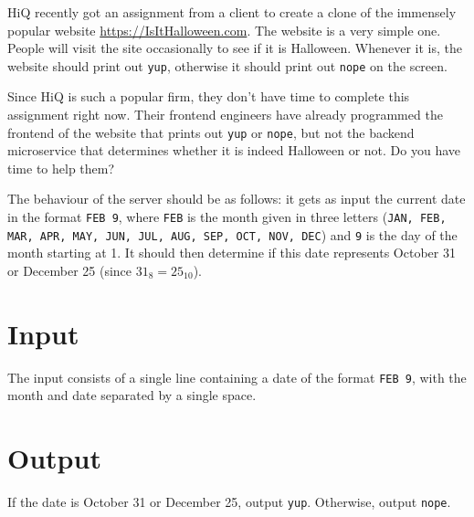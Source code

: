 
\noindent
HiQ recently got an assignment from a client to create a clone of the immensely popular website \url{https://IsItHalloween.com}.
The website is a very simple one.
People will visit the site occasionally to see if it is Halloween.
Whenever it is, the website should print out \texttt{yup}, otherwise it should print out \texttt{nope} on the screen.

Since HiQ is such a popular firm, they don't have time to complete this assignment right now.
Their frontend engineers have already programmed the frontend of the website that prints out \texttt{yup} or \texttt{nope}, but not the backend microservice that determines whether it is indeed Halloween or not.
Do you have time to help them?

The behaviour of the server should be as follows: it gets as input the current date in the format \texttt{FEB 9}, where \texttt{FEB} is the month given in three letters (\texttt{JAN, FEB, MAR, APR, MAY, JUN, JUL, AUG, SEP, OCT, NOV, DEC}) and \texttt{9} is the day of the month starting at 1.
It should then determine if this date represents October 31 or December 25 (since $31_8 = 25_{10}$).

\section*{Input}
The input consists of a single line containing a date of the format \texttt{FEB 9}, with the month and date separated by a single space.

\section*{Output}
If the date is October 31 or December 25, output \texttt{yup}.
Otherwise, output \texttt{nope}.
